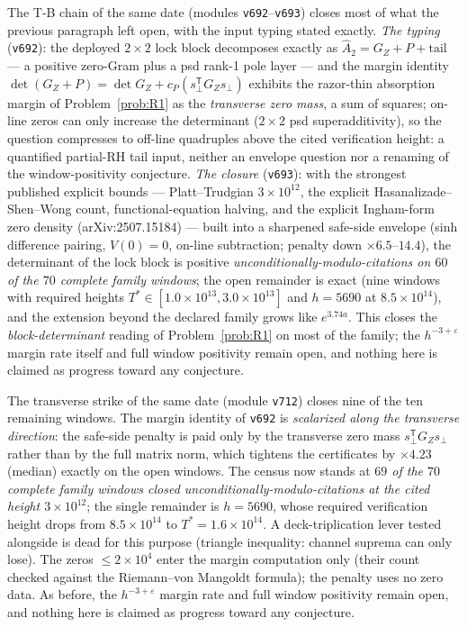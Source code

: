 \documentclass[11pt,a4paper]{article}
\theoremstyle{plain}
\theoremstyle{definition}
\begin{document}
The T-B chain of the same date (modules \texttt{v692}--\texttt{v693})
closes most of what the previous paragraph left open, with the input
typing stated exactly.  \emph{The typing} (\texttt{v692}): the deployed
$2\times2$ lock block decomposes exactly as $\hat
A_2=G_Z+P+\mathrm{tail}$ --- a positive zero-Gram plus a psd rank-1
pole layer --- and the margin identity $\det(G_Z+P)=\det
G_Z+c_P(s_\perp^{\mathsf T}G_Zs_\perp)$ exhibits the razor-thin
absorption margin of Problem~\ref{prob:R1} as the \emph{transverse
zero mass}, a sum of squares; on-line zeros can only increase the
determinant ($2\times2$ psd superadditivity), so the question
compresses to off-line quadruples above the cited verification
height: a quantified partial-RH tail input, neither an envelope
question nor a renaming of the window-positivity conjecture.
\emph{The closure} (\texttt{v693}): with the strongest published
explicit bounds --- Platt--Trudgian $3\times10^{12}$, the explicit
Hasanalizade--Shen--Wong count, functional-equation halving, and the
explicit Ingham-form zero density (arXiv:2507.15184) --- built into a
sharpened safe-side envelope (sinh difference pairing, $V(0)=0$,
on-line subtraction; penalty down $\times6.5$--$14.4$), the
determinant of the lock block is positive
\emph{unconditionally-modulo-citations on $60$ of the $70$ complete
family windows}; the open remainder is exact (nine windows with
required heights $T^*\in[1.0\times10^{13},3.0\times10^{13}]$ and
$h=5690$ at $8.5\times10^{14}$), and the extension beyond the
declared family grows like $e^{3.74a}$.  This closes the
\emph{block-determinant} reading of Problem~\ref{prob:R1} on most of
the family; the $h^{-3+\varepsilon}$ margin rate itself and full
window positivity remain open, and nothing here is claimed as
progress toward any conjecture.

The transverse strike of the same date (module \texttt{v712}) closes
nine of the ten remaining windows.  The margin identity of
\texttt{v692} is \emph{scalarized along the transverse direction}:
the safe-side penalty is paid only by the transverse zero mass
$s_\perp^{\mathsf T}G_Zs_\perp$ rather than by the full matrix norm,
which tightens the certificates by $\times4.23$ (median) exactly on
the open windows.  The census now stands at \emph{$69$ of the $70$
complete family windows closed unconditionally-modulo-citations at
the cited height $3\times10^{12}$}; the single remainder is
$h=5690$, whose required verification height drops from
$8.5\times10^{14}$ to $T^*=1.6\times10^{14}$.  A deck-triplication
lever tested alongside is dead for this purpose (triangle
inequality: channel suprema can only lose).  The zeros
$\le2\times10^{4}$ enter the margin computation only (their count
checked against the Riemann--von Mangoldt formula); the penalty uses
no zero data.  As before, the $h^{-3+\varepsilon}$ margin rate and
full window positivity remain open, and nothing here is claimed as
progress toward any conjecture.
\end{document}
